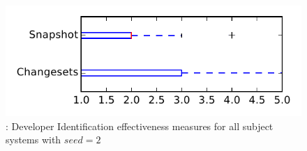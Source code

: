 
\begin{figure}
\centering
\includegraphics[height=0.4\textheight]{figures/dit_seed/rq1_tiny_2}
\caption{\rtwo: Developer Identification effectiveness measures for all subject systems with $seed=2$}
\label{fig:dit_seed:rq1:tiny}
\end{figure}
